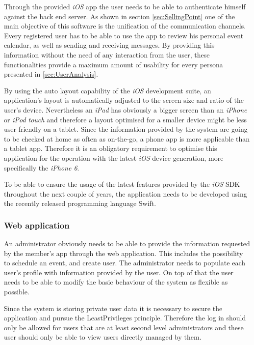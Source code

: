 Through the provided \emph{iOS} app the user needs to be able to authenticate himself against the back end server. As shown in section \vref{sec:SellingPoint} one of the main objective of this software is the unification of the communication channels. Every registered user has to be able to use the app to review his personal event calendar, as well as sending and receiving messages. By providing this information without the need of any interaction from the user, these functionalities provide a maximum amount of usability for every persona presented in \vref{sec:UserAnalysis}. 

By using the auto layout capability of the \emph{iOS} development suite, an application's layout is automatically adjusted to the screen size and ratio of the user's device. Nevertheless an \emph{iPad} has obviously a bigger screen than an \emph{iPhone} or \emph{iPod touch} and therefore a layout optimised for a smaller device might be less user friendly on a tablet. Since the information provided by the system are going to be checked at home as often as on-the-go, a phone app is more applicable than a tablet app. Therefore it is an obligatory requirement to optimise this application for the operation with the latest \emph{iOS} device generation, more specifically the \emph{iPhone 6}.

To be able to ensure the usage of the latest features provided by the \emph{iOS} \gls{SDK} throughout the next couple of years, the application needs to be developed using the recently released programming language \gls{Swift}.

\subsubsection{Web application}

An administrator obviously needs to be able to provide the information requested by the member's app through the web application. This includes the possibility to schedule an event, and create user. The administrator needs to populate each user's profile with information provided by the user. On top of that the user needs to be able to modify the basic behaviour of the system as flexible as possible.

Since the system is storing private user data it is necessary to secure the application and pursue the \gls{LeastPrivileges} principle. Therefore the log in should only be allowed for users that are at least second level administrators and these user should only be able to view users directly managed by them.

